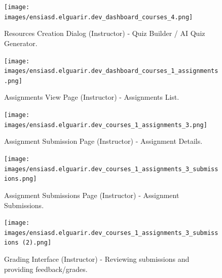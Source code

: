 \documentclass[12pt,a4paper]{article}
\begin{document}
\begin{figure}[H]
    \centering
    \texttt{[image: images/ensiasd.elguarir.dev\_dashboard\_courses\_4.png]}
    \caption{Resources Creation Dialog (Instructor) - Quiz Builder / AI Quiz Generator.}
    \label{fig:screen-resource-quizbuilder}
\end{figure}
\FloatBarrier

\begin{figure}[H]
    \centering
    \texttt{[image: images/ensiasd.elguarir.dev\_dashboard\_courses\_1\_assignments.png]}
    \caption{Assignments View Page (Instructor) - Assignments List.}
    \label{fig:screen-assignment-list}
\end{figure}
\FloatBarrier

\begin{figure}[H]
    \centering
    \texttt{[image: images/ensiasd.elguarir.dev\_courses\_1\_assignments\_3.png]}
    \caption{Assignment Submission Page (Instructor) - Assignment Details.}
    \label{fig:screen-assignment-details}
\end{figure}
\FloatBarrier

\begin{figure}[H]
    \centering
    \texttt{[image: images/ensiasd.elguarir.dev\_courses\_1\_assignments\_3\_submissions.png]}
    \caption{Assignment Submissions Page (Instructor) - Assignment Submissions.}
    \label{fig:screen-assignment-submissions}
\end{figure}
\FloatBarrier

\begin{figure}[H]
    \centering
    \texttt{[image: images/ensiasd.elguarir.dev\_courses\_1\_assignments\_3\_submissions (2).png]}
    \caption{Grading Interface (Instructor) - Reviewing submissions and providing feedback/grades.}
    \label{fig:screen-grading}
\end{figure}

\FloatBarrier
\clearpage

\end{document}
